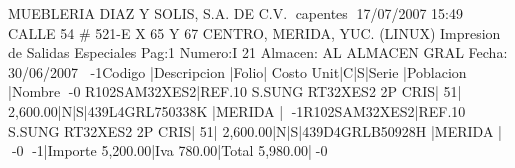                       MUEBLERIA DIAZ Y SOLIS, S.A. DE C.V.                      
capentes 17/07/2007 15:49 CALLE 54 # 521-E X 65 Y 67 CENTRO, MERIDA, YUC. (LINUX)
                     Impresion de Salidas Especiales Pag:1                      
Numero:I    21 Almacen: AL ALMACEN GRAL Fecha: 30/06/2007
-1Codigo       |Descripcion                   |Folio|  Costo Unit|C|S|Serie               |Poblacion |Nombre              -0
R102SAM32XES2|REF.10 S.SUNG RT32XES2 2P CRIS|   51|    2,600.00|N|S|439L4GRL750338K     |MERIDA    |                    
-1R102SAM32XES2|REF.10 S.SUNG RT32XES2 2P CRIS|   51|    2,600.00|N|S|439D4GRLB50928H     |MERIDA    |                    -0
    -1|Importe    5,200.00|Iva          780.00|Total      5,980.00|-0

